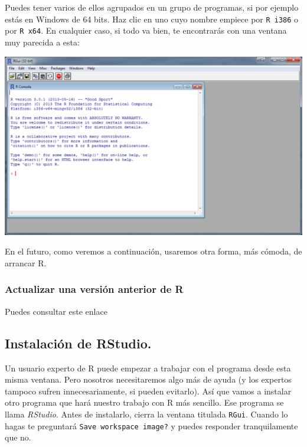 \documentclass[10pt,a4paper]{article}\usepackage[]{graphicx}\usepackage[]{color}
\newcounter {cont01}
\begin{document}
Puedes tener varios de ellos agrupados en un grupo de programas, si por ejemplo estás en Windows de
64 bits. Haz clic en uno cuyo nombre empiece por {\tt R i386} o por {\tt R x64}. En cualquier caso,
si todo va bien, te encontrarás con una ventana muy parecida a esta:
    \begin{center}
    \includegraphics[width=15cm]{../fig/Tut00-40.png}
    \end{center}
En el futuro, como veremos a continuación, usaremos otra forma, más cómoda, de arrancar R.

\subsubsection*{Actualizar una versión anterior de R}

Puedes consultar este enlace
\begin{center}
\end{center}

\subsection{Instalación de RStudio.}

Un usuario experto de R puede empezar a trabajar con el programa desde esta misma ventana. Pero
nosotros necesitaremos algo más de ayuda (y los expertos tampoco sufren innecesariamente, si pueden
evitarlo). Así que vamos a instalar otro programa que hará nuestro trabajo con R más sencillo. Ese
programa se llama {\em RStudio}. Antes de instalarlo, cierra la ventana titulada {\tt RGui}. Cuando
lo hagas te preguntará {\tt Save workspace image?} y puedes responder tranquilamente que no.
\end{document}
